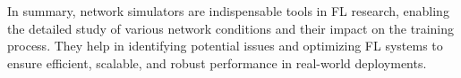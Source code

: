 In summary, network simulators are indispensable tools in FL research, enabling the detailed study of various network conditions and their impact on the training process. They help in identifying potential issues and optimizing FL systems to ensure efficient, scalable, and robust performance in real-world deployments.



